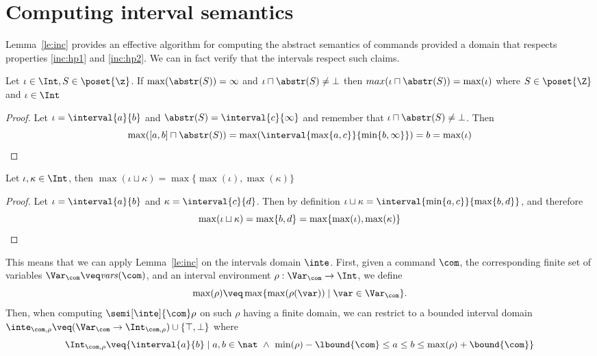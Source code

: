\section{Computing interval semantics}
\label{sec:computingint}

Lemma~\ref{le:inc} provides an effective algorithm for computing the
abstract semantics of commands provided a domain that respects
properties \ref{inc:hp1} and \ref{inc:hp2}. We can in fact verify that
the intervals respect such claims.

\begin{observation}
  Let \(\iota \in \Int, S \in \poset{\z}\). If
  \(\max(\abstr(S)) = \infty\) and
  \({\iota \sqcap \abstr(S) \neq \bot}\) then
  \({max(\iota \sqcap \abstr(S)) = \max(\iota)}\) where
  \(S \in \poset{\Z}\) and \(\iota \in \Int\)
\end{observation}

\begin{proof}
  Let \(\iota = \interval{a}{b}\) and
  \(\abstr(S) = \interval{c}{\infty}\) and remember that
  \({\iota \sqcap \abstr(S) \neq \bot}\). Then
  \begin{equation*}
    \max([a,b] \sqcap \abstr(S)) = \max(\interval{\max\{a, c\}}{\min\{b , \infty\}}) = b = \max(\iota) \qedhere
  \end{equation*}
\end{proof}

\begin{observation}
  Let \(\iota, \kappa \in \Int\), then
  \(\max(\iota \sqcup \kappa) = \max\{\max(\iota), \max(\kappa)\}\)
\end{observation}

\begin{proof}
  Let \(\iota = \interval{a}{b}\) and \(\kappa =
  \interval{c}{d}\). Then by definition
  \(\iota \sqcup \kappa = \interval{\min\{a,c\}}{\max\{b,d\}}\), and
  therefore
  \begin{equation*}
    \max(\iota \sqcup \kappa) = \max\{b,d\} = \max\{\max(\iota), \max(\kappa)\} \qedhere
  \end{equation*}
\end{proof}

This means that we can apply Lemma~\ref{le:inc} on the intervals
domain \(\inte\).  First, given a command \(\com\), the corresponding
finite set of variables \(\Var_{\com} \veq \mathit{vars}(\com)\), and
an interval environment \(\rho : \Var_{\com} \to \Int\), we define
\[\max(\rho) \veq \max \{ \max(\rho(\var)) \mid \var \in \Var_{\com}
  \}.\]
%
Then, when computing \(\semi[\inte]{\com} \rho\) on such \(\rho\)
having a finite domain, we can restrict to a bounded interval domain
\(\inte_{\com,\rho} \veq (\Var_{\com} \to \Int_{\com,\rho}) \cup
\{ \top, \bot \}\) where
\begin{equation*}
  \Int_{\com,\rho} \veq \{ \interval{a}{b} \mid a, b \in \nat\ \land\
  \min(\rho) - \lbound{\com} \leq a \leq b \leq \max(\rho) + \bound{\com}\}
\end{equation*}

